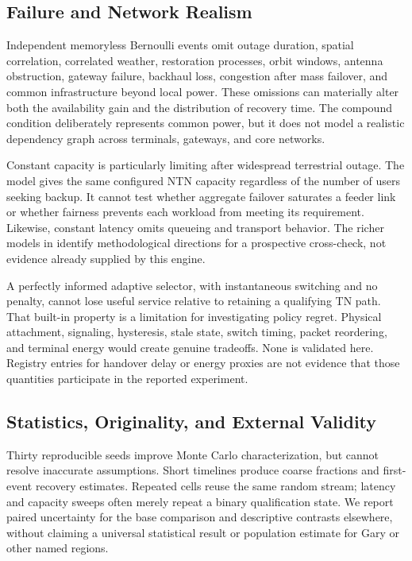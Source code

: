 \documentclass{IEEEoj}
\begin{document}
\subsection{Failure and Network Realism}
Independent memoryless Bernoulli events omit outage duration, spatial correlation, correlated weather, restoration processes, orbit windows, antenna obstruction, gateway failure, backhaul loss, congestion after mass failover, and common infrastructure beyond local power. These omissions can materially alter both the availability gain and the distribution of recovery time. The compound condition deliberately represents common power, but it does not model a realistic dependency graph across terminals, gateways, and core networks.

Constant capacity is particularly limiting after widespread terrestrial outage. The model gives the same configured NTN capacity regardless of the number of users seeking backup. It cannot test whether aggregate failover saturates a feeder link or whether fairness prevents each workload from meeting its requirement. Likewise, constant latency omits queueing and transport behavior. The richer models in \cite{wang2026,figaro2026} identify methodological directions for a prospective cross-check, not evidence already supplied by this engine.

A perfectly informed adaptive selector, with instantaneous switching and no penalty, cannot lose useful service relative to retaining a qualifying TN path. That built-in property is a limitation for investigating policy regret. Physical attachment, signaling, hysteresis, stale state, switch timing, packet reordering, and terminal energy would create genuine tradeoffs. None is validated here. Registry entries for handover delay or energy proxies are not evidence that those quantities participate in the reported experiment.

\subsection{Statistics, Originality, and External Validity}
Thirty reproducible seeds improve Monte Carlo characterization, but cannot resolve inaccurate assumptions. Short timelines produce coarse fractions and first-event recovery estimates. Repeated cells reuse the same random stream; latency and capacity sweeps often merely repeat a binary qualification state. We report paired uncertainty for the base comparison and descriptive contrasts elsewhere, without claiming a universal statistical result or population estimate for Gary or other named regions.
\end{document}
